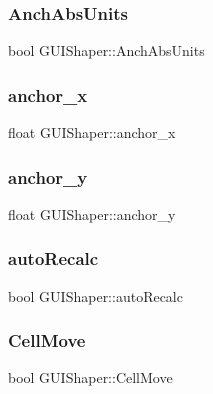 \subsubsection{\texorpdfstring{Anch\+Abs\+Units}{AnchAbsUnits}}
{\footnotesize\ttfamily bool G\+U\+I\+Shaper\+::\+Anch\+Abs\+Units}

\hypertarget{class_g_u_i_shaper_ab289f15431bd5aae24f7401bfe57ac7f}{}\label{class_g_u_i_shaper_ab289f15431bd5aae24f7401bfe57ac7f} 
\subsubsection{\texorpdfstring{anchor\+\_\+x}{anchor\_x}}
{\footnotesize\ttfamily float G\+U\+I\+Shaper\+::anchor\+\_\+x}

\hypertarget{class_g_u_i_shaper_a840a9182b466cd2aaea5708df98d8c07}{}\label{class_g_u_i_shaper_a840a9182b466cd2aaea5708df98d8c07} 
\subsubsection{\texorpdfstring{anchor\+\_\+y}{anchor\_y}}
{\footnotesize\ttfamily float G\+U\+I\+Shaper\+::anchor\+\_\+y}

\hypertarget{class_g_u_i_shaper_a54e0093d52f4c09bcd97c85aaae7c156}{}\label{class_g_u_i_shaper_a54e0093d52f4c09bcd97c85aaae7c156} 
\subsubsection{\texorpdfstring{auto\+Recalc}{autoRecalc}}
{\footnotesize\ttfamily bool G\+U\+I\+Shaper\+::auto\+Recalc}

\hypertarget{class_g_u_i_shaper_af5315c3768073d007564a40903b94c44}{}\label{class_g_u_i_shaper_af5315c3768073d007564a40903b94c44} 
\subsubsection{\texorpdfstring{Cell\+Move}{CellMove}}
{\footnotesize\ttfamily bool G\+U\+I\+Shaper\+::\+Cell\+Move}

